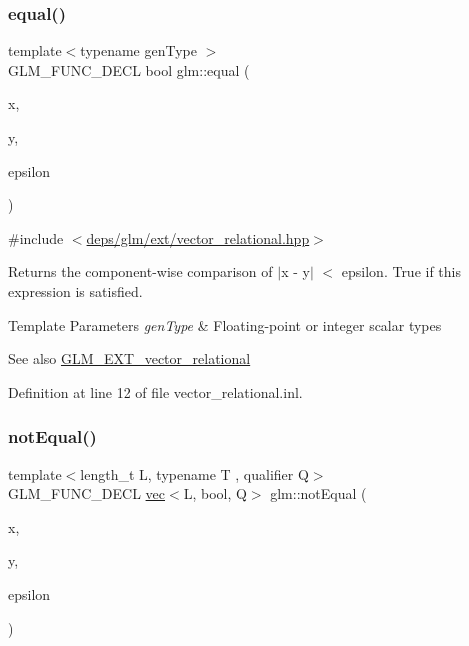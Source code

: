 \subsubsection{\texorpdfstring{equal()}{equal()}\hspace{0.1cm}{\footnotesize\ttfamily [3/3]}}
{\footnotesize\ttfamily template$<$typename gen\+Type $>$ \\
G\+L\+M\+\_\+\+F\+U\+N\+C\+\_\+\+D\+E\+CL bool glm\+::equal (\begin{DoxyParamCaption}\item[{gen\+Type const \&}]{x,  }\item[{gen\+Type const \&}]{y,  }\item[{gen\+Type const \&}]{epsilon }\end{DoxyParamCaption})}



{\ttfamily \#include $<$\hyperlink{ext_2vector__relational_8hpp}{deps/glm/ext/vector\+\_\+relational.\+hpp}$>$}

Returns the component-\/wise comparison of $\vert$x -\/ y$\vert$ $<$ epsilon. True if this expression is satisfied.


\begin{DoxyTemplParams}{Template Parameters}
{\em gen\+Type} & Floating-\/point or integer scalar types\\
\hline
\end{DoxyTemplParams}
\begin{DoxySeeAlso}{See also}
\hyperlink{group__ext__vector__relational}{G\+L\+M\+\_\+\+E\+X\+T\+\_\+vector\+\_\+relational} 
\end{DoxySeeAlso}


Definition at line 12 of file vector\+\_\+relational.\+inl.

\mbox{\label{group__ext__vector__relational_ga59a03a51402b6e1ce80f9a3b436f17bd}} 
\subsubsection{\texorpdfstring{not\+Equal()}{notEqual()}\hspace{0.1cm}{\footnotesize\ttfamily [1/3]}}
{\footnotesize\ttfamily template$<$length\+\_\+t L, typename T , qualifier Q$>$ \\
G\+L\+M\+\_\+\+F\+U\+N\+C\+\_\+\+D\+E\+CL \hyperlink{structglm_1_1vec}{vec}$<$L, bool, Q$>$ glm\+::not\+Equal (\begin{DoxyParamCaption}\item[{\hyperlink{structglm_1_1vec}{vec}$<$ L, T, Q $>$ const \&}]{x,  }\item[{\hyperlink{structglm_1_1vec}{vec}$<$ L, T, Q $>$ const \&}]{y,  }\item[{T const \&}]{epsilon }\end{DoxyParamCaption})}



